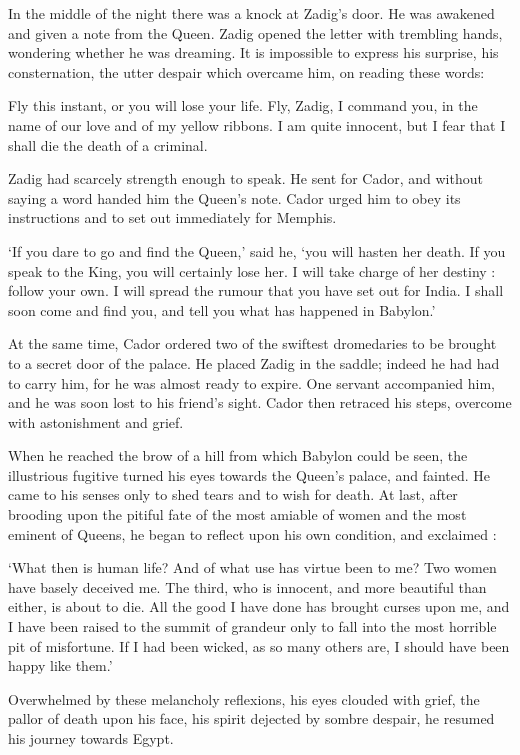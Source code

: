 \documentclass{article}
\begin{document}
\begin{center}
In the middle of the night there was a knock at Zadig's door. He was awakened and 
given a note from the Queen. Zadig opened the letter with trembling hands, wondering 
whether he was dreaming. It is impossible to express his surprise, his consternation, 
the utter despair which overcame him, on reading these words: 

Fly this instant, or you will lose your life. Fly, Zadig, I command you, in the 
name of our love and of my yellow ribbons. I am quite innocent, but I fear that 
I shall die the death of a criminal. 

Zadig had scarcely strength enough to speak. He sent for Cador, and without saying 
a word handed him the Queen's note. Cador urged him to obey its instructions and 
to set out immediately for Memphis. 

`If you dare to go and find the Queen,' said he, `you will hasten her death. If 
you speak to the King, you will certainly lose her. I will take charge of her destiny 
: follow your own. I will spread the rumour that you have set out for India. I 
shall soon come and find you, and tell you what has happened in Babylon.' 

At the same time, Cador ordered two of the swiftest dromedaries to be brought to 
a secret door of the palace. He placed Zadig in the saddle; indeed he had had to 
carry him, for he was almost ready to expire. One servant accompanied him, and 
he was soon lost to his friend's sight. Cador then retraced his steps, overcome 
with astonishment and grief. 

When he reached the brow of a hill from which Babylon could be seen, the illustrious 
fugitive turned his eyes towards the Queen's palace, and fainted. He came to his 
senses only to shed tears and to wish for death. At last, after brooding upon the 
pitiful fate of the most amiable of women and the most eminent of Queens, he began 
to reflect upon his own condition, and exclaimed : 

`What then is human life? And of what use has virtue been to me? Two women have 
basely deceived me. The third, who is innocent, and more beautiful than either, 
is about to die. All the good I have done has brought curses upon me, and I have 
been raised to the summit of grandeur only to fall into the most horrible pit of 
misfortune. If I had been wicked, as so many others are, I should have been happy 
like them.' 

Overwhelmed by these melancholy reflexions, his eyes clouded with grief, the pallor 
of death upon his face, his spirit dejected by sombre despair, he resumed his journey 
towards Egypt.\pagebreak{} 


\end{center}
\end{document}
